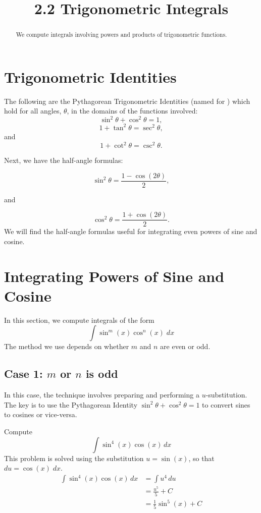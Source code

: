 \documentclass{ximera}
\title{2.2 Trigonometric Integrals}
\begin{document}
\begin{abstract}
We compute integrals involving powers and products of trigonometric functions.
\end{abstract}

\maketitle

\section{Trigonometric Identities}

The following are the Pythagorean Trigonometric Identities 
(named for ) which hold for all angles,
$\theta$, in the domains of the functions involved:
\[
\sin^2\theta + \cos^2\theta = 1,
\]
\[
1 + \tan^2\theta = \sec^2\theta,
\]
and
\[
1 + \cot^2\theta = \csc^2\theta.
\]


Next, we have the half-angle formulas:

\[
\sin^2\theta = \frac{1-\cos(2\theta)}{2},
\]

and

\[
\cos^2\theta = \frac{1+\cos(2\theta)}{2}.
\]
We will find the half-angle formulas useful for integrating even powers of sine and cosine.

\section{Integrating Powers of Sine and Cosine}

In this section, we compute integrals of the form
\[
\int \sin^m(x) \cos^n(x) \; dx
\]
The method we use depends on whether $m$ and $n$ are even or odd.

\subsection{Case 1: $m$ or $n$ is odd}
In this case, the technique involves preparing and performing a $u$-substitution. The key is to use the Pythagorean 
Identity $\sin^2 \theta + \cos^2 \theta = 1$ to convert
sines to cosines or vice-versa.

\begin{example}[example 1]
Compute
\[
\int \sin^4(x) \cos(x) \, dx
\]
This problem is solved using the substitution $u = \sin(x)$, so that $du = \cos(x) \; dx$.
\begin{align*}
\int \sin^4(x) \cos(x) \, dx &= \int u^4 \, du\\
                             &= \frac{u^5}{5} + C\\
                             &= \frac15 \sin^5(x) + C
\end{align*}

\end{example}
\end{document}
